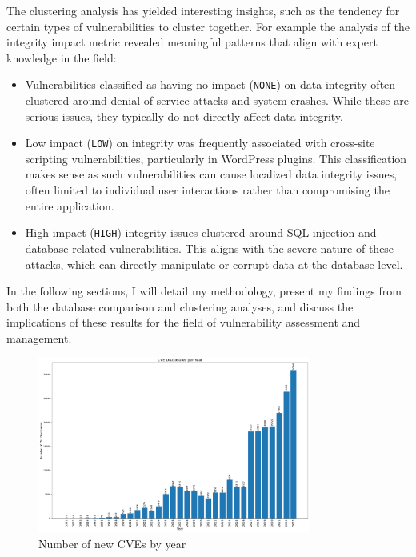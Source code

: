 \documentclass[12pt]{article}
\begin{document}
The clustering analysis has yielded interesting insights, such as the tendency for certain types of
vulnerabilities to cluster together. For example the analysis of the integrity impact metric revealed meaningful patterns that align with expert knowledge in the field:

\begin{itemize}

	\item Vulnerabilities classified as having no impact (\texttt{NONE}) on data integrity often
	      clustered around denial of service attacks and system crashes. While these are serious
	      issues, they typically do not directly affect data integrity.

	\item Low impact (\texttt{LOW}) on integrity was frequently associated with cross-site scripting
	      vulnerabilities, particularly in WordPress plugins. This classification makes sense as such
	      vulnerabilities can cause localized data integrity issues, often limited to individual user
	      interactions rather than compromising the entire application.

	\item High impact (\texttt{HIGH}) integrity issues clustered around SQL injection and
	      database-related vulnerabilities. This aligns with the severe nature of these attacks, which
	      can directly manipulate or corrupt data at the database level.

\end{itemize}


In the following sections, I will detail my methodology, present my findings from both the
database comparison and clustering analyses, and discuss the implications of these results for the
field of vulnerability assessment and management.


\begin{figure}[ht] \centering
	\includegraphics[width=0.8\textwidth]{figures/cves_per_year.pdf}
	\caption{\label{fig:cves_per_year}Number of new CVEs by year}
\end{figure}
\end{document}
